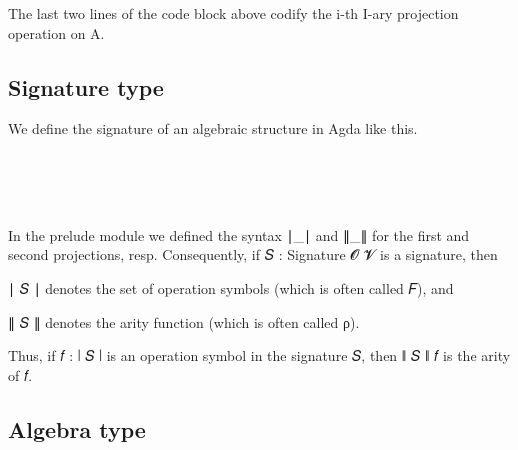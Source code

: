 \documentclass[sigplan,screen]{acmart}
\begin{document}
The last two lines of the code block above codify the i-th I-ary projection operation on A.

\subsection{Signature type}

We define the signature of an algebraic structure in Agda like this.

\begin{code}%
\>[0]\<%
\\
\>[0]\<%
\\
\>[0]\AgdaSpace{}%
\AgdaSymbol{:}\AgdaSpace{}%
\AgdaSymbol{(}\AgdaSpace{}%
\AgdaSpace{}%
\AgdaSymbol{:}\AgdaSpace{}%
\AgdaSymbol{)}\AgdaSpace{}%
\AgdaSpace{}%
\AgdaSpace{}%
\AgdaSpace{}%
\AgdaSpace{}%
\AgdaSpace{}%
\AgdaSpace{}%
\<%
\\
\>[0]\AgdaSpace{}%
\AgdaSpace{}%
\AgdaSpace{}%
\AgdaSymbol{=}\AgdaSpace{}%
\AgdaSpace{}%
\AgdaSpace{}%
\AgdaSpace{}%
\AgdaSpace{}%
%
\>[27]\AgdaFunction{,}\AgdaSpace{}%
\AgdaSymbol{(}\AgdaSpace{}%
\AgdaSpace{}%
\AgdaSpace{}%
\AgdaSpace{}%
\AgdaSpace{}%
\AgdaSymbol{)}\<%
\end{code}

In the prelude module we defined the syntax ∣\_∣ and ∥\_∥ for the first and second projections, resp.  Consequently, if 𝑆 : Signature 𝓞 𝓥 is a signature, then

∣ 𝑆 ∣ denotes the set of operation symbols (which is often called 𝐹), and

∥ 𝑆 ∥ denotes the arity function (which is often called ρ).

Thus, if  𝑓 : ∣ 𝑆 ∣  is an operation symbol in the signature 𝑆, then ∥ 𝑆 ∥ 𝑓 is the arity of 𝑓.

\subsection{Algebra type}
\end{document}
